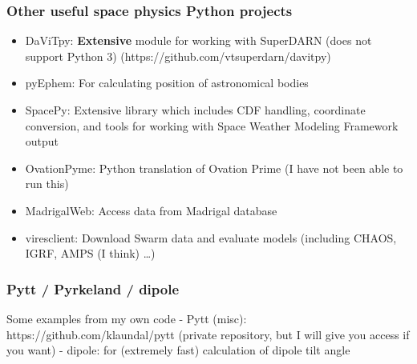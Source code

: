 \documentclass[11pt]{article}
\providecommand{\tightlist}{%
      \setlength{\itemsep}{0pt}\setlength{\parskip}{0pt}}
\begin{document}
    \hypertarget{other-useful-space-physics-python-projects}{%
\subsubsection{Other useful space physics Python
projects}\label{other-useful-space-physics-python-projects}}

\begin{itemize}
\tightlist
\item
  DaViTpy: \textbf{Extensive} module for working with SuperDARN (does
  not support Python 3) (https://github.com/vtsuperdarn/davitpy)
\item
  pyEphem: For calculating position of astronomical bodies
\item
  SpacePy: Extensive library which includes CDF handling, coordinate
  conversion, and tools for working with Space Weather Modeling
  Framework output
\item
  OvationPyme: Python translation of Ovation Prime (I have not been able
  to run this)
\item
  MadrigalWeb: Access data from Madrigal database
\item
  viresclient: Download Swarm data and evaluate models (including CHAOS,
  IGRF, AMPS (I think) \ldots{})
\end{itemize}

    \hypertarget{pytt-pyrkeland-dipole}{%
\subsubsection{Pytt / Pyrkeland / dipole}\label{pytt-pyrkeland-dipole}}

Some examples from my own code - Pytt (misc):
https://github.com/klaundal/pytt (private repository, but I will give
you access if you want) - dipole: for (extremely fast) calculation of
dipole tilt angle
\end{document}
